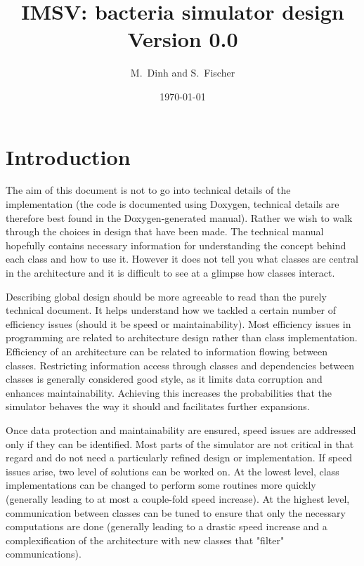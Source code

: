 \documentclass[12pt]{article}
\theoremstyle{definition}
\theoremstyle{remark}
\numberwithin{equation}{section}
\begin{document}
\normalem

\title{{IMSV}: bacteria simulator design \\ Version 0.0}%
\author{M.~Dinh and S.~Fischer}%
\date{\today}%

\newpage

\tableofcontents

\newpage

\section{Introduction}

The aim of this document is not to go into technical details of the implementation (the code is documented using Doxygen, technical details are therefore best found in the Doxygen-generated manual). Rather we wish to walk through the choices in design that have been made. The technical manual hopefully contains necessary information for understanding the concept behind each class and how to use it. However it does not tell you what classes are central in the architecture and it is difficult to see at a glimpse how classes interact.

Describing global design should be more agreeable to read than the purely technical document. It helps understand how we tackled a certain number of efficiency issues (should it be speed or maintainability). Most efficiency issues in programming are related to architecture design rather than class implementation. Efficiency of an architecture can be related to information flowing between classes. Restricting information access through classes and dependencies between classes is generally considered good style, as it limits data corruption and enhances maintainability. Achieving this increases the probabilities that the simulator behaves the way it should and facilitates further expansions.

Once data protection and maintainability are ensured, speed issues are addressed only if they can be identified. Most parts of the simulator are not critical in that regard and do not need a particularly refined design or implementation. If speed issues arise, two level of solutions can be worked on. At the lowest level, class implementations can be changed to perform some routines more quickly (generally leading to at most a couple-fold speed increase). At the highest level, communication between classes can be tuned to ensure that only the necessary computations are done (generally leading to a drastic speed increase and a complexification of the architecture with new classes that "filter" communications).
\end{document}
